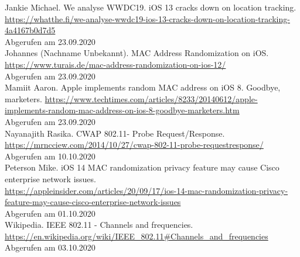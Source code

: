 \newline
Jankie Michael. We analyse WWDC19. iOS 13 cracks down on location tracking.
\url{https://whatthe.fi/we-analyse-wwdc19-ios-13-cracks-down-on-location-tracking-4a4167b0d7d5} \\
Abgerufen am 23.09.2020 \\
\newline
Johannes (Nachname Unbekannt). MAC Address Randomization on iOS.
\url{https://www.turais.de/mac-address-randomization-on-ios-12/} \\
Abgerufen am 23.09.2020 \\
\clearpage 
Mamiit Aaron. Apple implements random MAC address on iOS 8. Goodbye, marketers.
\url{https://www.techtimes.com/articles/8233/20140612/apple-implements-random-mac-address-on-ios-8-goodbye-marketers.htm} \\
Abgerufen am 23.09.2020 \\
\newline
Nayanajith Rasika. CWAP 802.11- Probe Request/Response. \\
\url{https://mrncciew.com/2014/10/27/cwap-802-11-probe-requestresponse/} \\
Abgerufen am 10.10.2020 \\
\newline
Peterson Mike. iOS 14 MAC randomization privacy feature may cause Cisco enterprise network issues. \\
\url{https://appleinsider.com/articles/20/09/17/ios-14-mac-randomization-privacy-feature-may-cause-cisco-enterprise-network-issues} \\
Abgerufen am 01.10.2020 \\
\newline
Wikipedia. IEEE 802.11 - Channels and frequencies. \\
\url{https://en.wikipedia.org/wiki/IEEE_802.11#Channels_and_frequencies} \\
Abgerufen am 03.10.2020 \\
